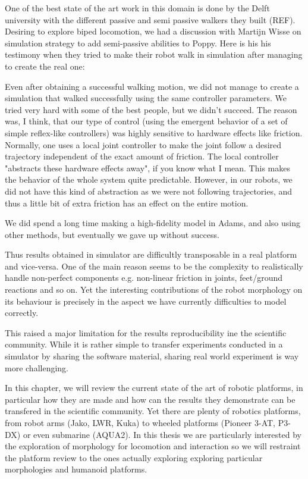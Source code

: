 One of the best state of the art work in this domain is done by the Delft university with the different passive and semi passive walkers they built (REF). Desiring to explore biped locomotion, we had a discussion with Martijn Wisse on simulation strategy to add semi-passive abilities to Poppy. Here is his his testimony when they tried to make their robot walk in simulation after managing to create the real one:

\begin{formal}

Even after obtaining a successful walking motion, we did not manage to create a simulation that walked successfully using the same controller parameters. We tried very hard with some of the best people, but we didn’t succeed. The reason was, I think, that our type of control (using the emergent behavior of a set of simple reflex-like controllers) was highly sensitive to hardware effects like friction. Normally, one uses a local joint controller to make the joint follow a desired trajectory independent of the exact amount of friction. The local controller "abstracts these hardware effects away", if you know what I mean. This makes the behavior of the whole system quite predictable. However, in our robots, we did not have this kind of abstraction as we were not following trajectories, and thus a little bit of extra friction has an effect on the entire motion.

We did spend a long time making a high-fidelity model in Adams, and also using other methods, but eventually we gave up without success.

\end{formal}

Thus results obtained in simulator are difficultly transposable in a real platform and vice-versa. One of the main reason seems to be the complexity to realistically handle non-perfect components e.g. non-linear friction in joints, feet/ground reactions and so on. Yet the interesting contributions of the robot morphology on its behaviour is precisely in the aspect we have currently difficulties to model correctly.

This raised a major limitation for the results reproducibility ine the scientific community. While it is rather simple to transfer experiments conducted in a simulator by sharing the software material, sharing real world experiment is way more challenging.

In this chapter, we will review the current state of the art of robotic platforms, in particular how they are made and how can the results they demonstrate can be transfered in the scientific community. Yet there are plenty of robotics platforms, from robot arms (Jako, LWR, Kuka) to wheeled platforms (Pioneer 3-AT, P3-DX) or even submarine (AQUA2). In this thesis we are particularly interested by the exploration of morphology for locomotion and interaction so we will restraint the platform review to the ones actually exploring exploring particular morphologies and  humanoid platforms.


